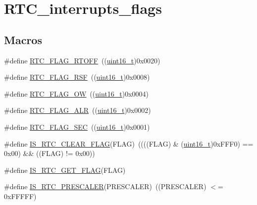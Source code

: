\hypertarget{group___r_t_c__interrupts__flags}{}\section{R\+T\+C\+\_\+interrupts\+\_\+flags}
\label{group___r_t_c__interrupts__flags}
\subsection*{Macros}
\begin{DoxyCompactItemize}
\item 
\#define \hyperlink{group___r_t_c__interrupts__flags_ga203dcbb991497e4d0e6722815f6db942}{R\+T\+C\+\_\+\+F\+L\+A\+G\+\_\+\+R\+T\+O\+FF}~((\hyperlink{_p_e___types_8h_a1f1825b69244eb3ad2c7165ddc99c956}{uint16\+\_\+t})0x0020)
\item 
\#define \hyperlink{group___r_t_c__interrupts__flags_ga78c4245996bef8d5f39226b6e37ed9c0}{R\+T\+C\+\_\+\+F\+L\+A\+G\+\_\+\+R\+SF}~((\hyperlink{_p_e___types_8h_a1f1825b69244eb3ad2c7165ddc99c956}{uint16\+\_\+t})0x0008)
\item 
\#define \hyperlink{group___r_t_c__interrupts__flags_ga4e321e359b914d7ed10eed985f8b4811}{R\+T\+C\+\_\+\+F\+L\+A\+G\+\_\+\+OW}~((\hyperlink{_p_e___types_8h_a1f1825b69244eb3ad2c7165ddc99c956}{uint16\+\_\+t})0x0004)
\item 
\#define \hyperlink{group___r_t_c__interrupts__flags_gaed4375a7ea5a147f83c6cf4bfa805caf}{R\+T\+C\+\_\+\+F\+L\+A\+G\+\_\+\+A\+LR}~((\hyperlink{_p_e___types_8h_a1f1825b69244eb3ad2c7165ddc99c956}{uint16\+\_\+t})0x0002)
\item 
\#define \hyperlink{group___r_t_c__interrupts__flags_ga8babb2c823c2097bf4a4ef0c20ef7367}{R\+T\+C\+\_\+\+F\+L\+A\+G\+\_\+\+S\+EC}~((\hyperlink{_p_e___types_8h_a1f1825b69244eb3ad2c7165ddc99c956}{uint16\+\_\+t})0x0001)
\item 
\#define \hyperlink{group___r_t_c__interrupts__flags_ga5f8a9327a258f16f29703fa3e3cc8af7}{I\+S\+\_\+\+R\+T\+C\+\_\+\+C\+L\+E\+A\+R\+\_\+\+F\+L\+AG}(F\+L\+AG)~((((F\+L\+AG) \& (\hyperlink{_p_e___types_8h_a1f1825b69244eb3ad2c7165ddc99c956}{uint16\+\_\+t})0x\+F\+F\+F0) == 0x00) \&\& ((\+F\+L\+A\+G) != 0x00))
\item 
\#define \hyperlink{group___r_t_c__interrupts__flags_ga2126725a0d48f1c40f42566e249620ef}{I\+S\+\_\+\+R\+T\+C\+\_\+\+G\+E\+T\+\_\+\+F\+L\+AG}(F\+L\+AG)
\item 
\#define \hyperlink{group___r_t_c__interrupts__flags_ga483b9ec67246cbfb2874c5a85f0cb4d8}{I\+S\+\_\+\+R\+T\+C\+\_\+\+P\+R\+E\+S\+C\+A\+L\+ER}(P\+R\+E\+S\+C\+A\+L\+ER)~((P\+R\+E\+S\+C\+A\+L\+ER) $<$= 0x\+F\+F\+F\+F\+F)

\end{DoxyCompactItemize}
